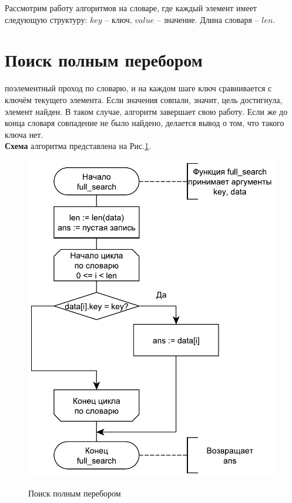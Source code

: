 Рассмотрим работу алгоритмов на словаре, где каждый элемент имеет следующую структуру: $key$ -- ключ, $value$ -- значение. Длина словаря -- $len$.

\section{Поиск полным перебором}
 поэлементный проход по словарю, и на каждом шаге ключ сравнивается с ключём текущего элемента. Если значения совпали, значит, цель достигнула, элемент найден. В таком случае, алгоритм завершает свою работу. Если же до конца словаря совпадение не было найдено, делается вывод о том, что такого ключа нет.\\

\textbf{Схема} алгоритма представлена на Рис.\ref{fig1:image}.
\begin{figure}[h]
	\begin{center}
		{\includegraphics[scale = 0.6]{schemes/full}}
		\caption{Поиск полным перебором}
		\label{fig1:image}
	\end{center}
\end{figure}

